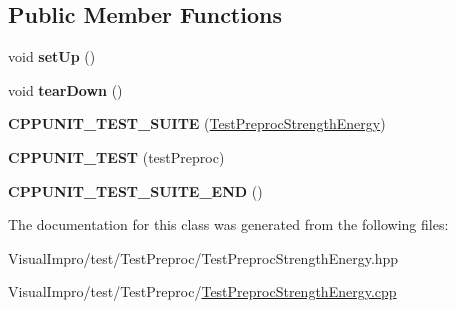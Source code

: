 \subsection*{Public Member Functions}
\begin{DoxyCompactItemize}
\item 
\mbox{\label{class_test_preproc_strength_energy_a4c351c241cc52b382c855d0e872cec91}} 
void {\bfseries set\+Up} ()
\item 
\mbox{\label{class_test_preproc_strength_energy_a4eb0862db74f61349fa940674beec8e3}} 
void {\bfseries tear\+Down} ()
\item 
\mbox{\label{class_test_preproc_strength_energy_a09910449f768def095755807d45880d0}} 
{\bfseries C\+P\+P\+U\+N\+I\+T\+\_\+\+T\+E\+S\+T\+\_\+\+S\+U\+I\+TE} (\mbox{\hyperlink{class_test_preproc_strength_energy}{Test\+Preproc\+Strength\+Energy}})
\item 
\mbox{\label{class_test_preproc_strength_energy_a8978a3e0d21545bdc78702f394f2ceca}} 
{\bfseries C\+P\+P\+U\+N\+I\+T\+\_\+\+T\+E\+ST} (test\+Preproc)
\item 
\mbox{\label{class_test_preproc_strength_energy_a01690e790f62ff9ac09e337982fb81cb}} 
{\bfseries C\+P\+P\+U\+N\+I\+T\+\_\+\+T\+E\+S\+T\+\_\+\+S\+U\+I\+T\+E\+\_\+\+E\+ND} ()
\end{DoxyCompactItemize}


The documentation for this class was generated from the following files\+:\begin{DoxyCompactItemize}
\item 
Visual\+Impro/test/\+Test\+Preproc/Test\+Preproc\+Strength\+Energy.\+hpp\item 
Visual\+Impro/test/\+Test\+Preproc/\mbox{\hyperlink{_test_preproc_strength_energy_8cpp}{Test\+Preproc\+Strength\+Energy.\+cpp}}\end{DoxyCompactItemize}
